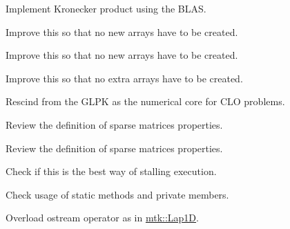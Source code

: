 
\begin{DoxyRefList}
\item[\label{todo__todo000001}%
\hypertarget{todo__todo000001}{}%
Member \hyperlink{classmtk_1_1DenseMatrix_a01d3d8bd502870f93bf3a88a0cc5fb49}{mtk\-:\-:Dense\-Matrix\-:\-:Kron} (const Dense\-Matrix \&aa, const Dense\-Matrix \&bb)]Implement Kronecker product using the B\-L\-A\-S.  
\item[\label{todo__todo000010}%
\hypertarget{todo__todo000010}{}%
Member \hyperlink{classmtk_1_1DenseMatrix_a59b9bea24acf39dca64e8549b3527463}{mtk\-:\-:Dense\-Matrix\-:\-:Order\-Col\-Major} ()]Improve this so that no new arrays have to be created.  
\item[\label{todo__todo000009}%
\hypertarget{todo__todo000009}{}%
Member \hyperlink{classmtk_1_1DenseMatrix_ac2949efba3e8278335d45418c85433e4}{mtk\-:\-:Dense\-Matrix\-:\-:Order\-Row\-Major} ()]Improve this so that no new arrays have to be created.  
\item[\label{todo__todo000008}%
\hypertarget{todo__todo000008}{}%
Member \hyperlink{classmtk_1_1DenseMatrix_a71d9c07ca66e88d97d1fd5012f43138b}{mtk\-:\-:Dense\-Matrix\-:\-:Transpose} ()]Improve this so that no extra arrays have to be created.  
\item[\label{todo__todo000002}%
\hypertarget{todo__todo000002}{}%
Class \hyperlink{classmtk_1_1GLPKAdapter}{mtk\-:\-:G\-L\-P\-K\-Adapter} ]Rescind from the G\-L\-P\-K as the numerical core for C\-L\-O problems.  
\item[\label{todo__todo000016}%
\hypertarget{todo__todo000016}{}%
Member \hyperlink{classmtk_1_1Matrix_ac96dd5f31ebcd4388352577487cd6f11}{mtk\-:\-:Matrix\-:\-:Increase\-Num\-Null} ()]Review the definition of sparse matrices properties.  
\item[\label{todo__todo000015}%
\hypertarget{todo__todo000015}{}%
Member \hyperlink{classmtk_1_1Matrix_a2e7c4b84d0cbf9b0122b5dc906ad1eae}{mtk\-:\-:Matrix\-:\-:Increase\-Num\-Zero} ()]Review the definition of sparse matrices properties.  
\item[\label{todo__todo000017}%
\hypertarget{todo__todo000017}{}%
Member \hyperlink{classmtk_1_1Tools_acbcff02946d3db565d53ecbcc459f0b5}{mtk\-:\-:Tools\-:\-:Prevent} (const bool condition, const char $\ast$fname, int lineno, const char $\ast$fxname)]Check if this is the best way of stalling execution.  
\item[\label{todo__todo000018}%
\hypertarget{todo__todo000018}{}%
Member \hyperlink{classmtk_1_1Tools_a04a60458594336ee1badff79b8a9a77f}{mtk\-:\-:Tools\-:\-:test\-\_\-number\-\_\-} ]Check usage of static methods and private members.  
\item[\label{todo__todo000011}%
\hypertarget{todo__todo000011}{}%
File \hyperlink{mtk__div__1d_8cc}{mtk\-\_\-div\-\_\-1d.cc} ]Overload ostream operator as in \hyperlink{classmtk_1_1Lap1D}{mtk\-::\-Lap1\-D}.


\end{DoxyRefList}
